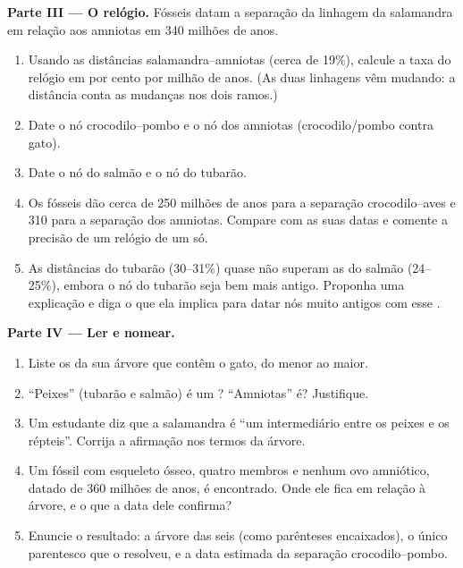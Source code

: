 \begin{problem}
\medskip
\noindent\textbf{Parte III --- O relógio.}
Fósseis datam a separação da linhagem da salamandra em relação aos
amniotas em 340 milhões de anos.
\begin{enumerate}[resume]
  \item Usando as distâncias salamandra--amniotas (cerca de 19\%),
        calcule a taxa do relógio em por cento por milhão de anos. (As
        duas linhagens vêm mudando: a distância conta as mudanças nos
        dois ramos.)
  \item Date o nó crocodilo--pombo e o nó dos amniotas
        (crocodilo/pombo contra gato).
  \item Date o nó do salmão e o nó do tubarão.
  \item Os fósseis dão cerca de 250 milhões de anos para a separação
        crocodilo--aves e 310 para a separação dos amniotas. Compare
        com as suas datas e comente a precisão de um relógio de um  só.
  \item As distâncias do tubarão (30--31\%) quase não superam as do
        salmão (24--25\%), embora o nó do tubarão seja bem mais antigo.
        Proponha uma explicação e diga o que ela implica para datar nós
        muito antigos com esse .
\end{enumerate}

\medskip
\noindent\textbf{Parte IV --- Ler e nomear.}
\begin{enumerate}[resume]
  \item Liste os  da sua árvore que contêm o gato, do menor ao
        maior.
  \item ``Peixes'' (tubarão e salmão) é um ? ``Amniotas'' é?
        Justifique.
  \item Um estudante diz que a salamandra é ``um intermediário entre os
        peixes e os répteis''. Corrija a afirmação nos termos da árvore.
  \item Um fóssil com esqueleto ósseo, quatro membros e nenhum ovo
        amniótico, datado de 360 milhões de anos, é encontrado. Onde
        ele fica em relação à árvore, e o que a data dele confirma?
  \item Enuncie o resultado: a árvore das seis  (como
        parênteses encaixados), o único parentesco que o  resolveu, e
        a data estimada da separação crocodilo--pombo.
\end{enumerate}
\end{problem}
